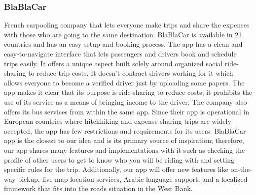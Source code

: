 \documentclass[a4paper, 12pt]{article} %
\begin{document}
            \subsubsection{BlaBlaCar}
                French carpooling company that lets everyone make trips and share the expenses with those who are going to the same destination.
                BlaBlaCar is available in 21 countries and has an easy setup and booking process. The app has a clean and easy-to-navigate interface that lets passengers and drivers book and schedule trips easily. It offers a unique aspect built solely around organized social ride-sharing to reduce trip costs. It doesn't contract drivers working for it which allows everyone to become a verified driver just by uploading some papers. The app makes it clear that its purpose is ride-sharing to reduce costs; it prohibits the use of its service as a means of bringing income to the driver. The company also offers its bus services from within the same app. Since their app is operational in European countries where hitchhiking and expense-sharing trips are widely accepted, the app has few restrictions and requirements for its users. \cite{blablacar_wiki} BlaBlaCar app is the closest to our idea and is its primary source of inspiration; therefore, our app shares many features and implementations with it such as checking the profile of other users to get to know who you will be riding with and setting specific rules for the trip. Additionally, our app will offer new features like on-the-way pickup, live map location services, Arabic language support, and a localized framework that fits into the roads situation in the West Bank.
\end{document}
